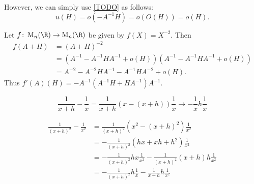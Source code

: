 \begin{examples}
    However, we can simply use \cref{TODO} as follows: \[
        u(H) = o(-A^{-1}H) = o(O(H)) = o(H).
    \]
    \item Let $f\colon \M_n(\R) \to \M_n(\R)$ be given by $f(X) = X^{-2}$.
    Then \begin{align*}
        f(A + H) &= (A + H)^{-2} \\
            &= (A^{-1} - A^{-1}HA^{-1} + o(H))
                (A^{-1} - A^{-1}HA^{-1} + o(H)) \\
            &= A^{-2} - A^{-2}HA^{-1} - A^{-1}HA^{-2} + o(H).
    \end{align*}
    Thus $f'(A)(H) = -A^{-1} (A^{-1} H + H A^{-1}) A^{-1}$.
\end{examples}
\begin{remarks}
    \item \[
        \frac1{x+h} - \frac1x = \frac1{x+h} (x - (x + h)) \frac1x
        \to -\frac1x h \frac1x
    \]
    \item \begin{align*}
        \frac1{(x+h)^2} - \frac1{x^2}
            &= \frac1{(x+h)^2} (x^2 - (x + h)^2) \frac1{x^2} \\
            &= -\frac1{(x+h)^2} (hx + xh + h^2) \frac1{x^2} \\
            &= -\frac1{(x+h)^2} h x \frac1{x^2}
                -\frac1{(x+h)^2} (x + h) h \frac1{x^2} \\
            &= -\frac1{(x+h)^2} h \frac1x
                -\frac1{x+h} h \frac1{x^2}
    \end{align*}
\end{remarks}
